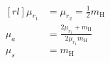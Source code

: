 %

\begin{equation}
    \begin{aligned}[rl]
         \mu_{r_1} &=  \mu_{r_2} = \frac{1}{2}m_\mathrm{H} \\
         \mu_{a}& = \frac{ 2 \mu_{r_1}  + m_\mathrm{H} }{2\mu_{r_1} m_\mathrm{H}} \\
         \mu_{s}&= m_\mathrm{H}
    \end{aligned}
\label{eq:masses}
\end{equation}

%